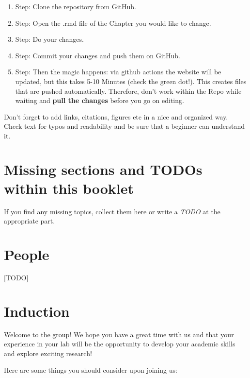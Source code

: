 \documentclass[
]{book}
\begin{document}
\begin{enumerate}
\def\labelenumi{\arabic{enumi}.}
\item
  Step: Clone the repository from GitHub.
\item
  Step: Open the .rmd file of the Chapter you would like to change.
\item
  Step: Do your changes.
\item
  Step: Commit your changes and push them on GitHub.
\item
  Step: Then the magic happens: via github actions the website will be
  updated, but this takes 5-10 Minutes (check the green dot!). This
  creates files that are pushed automatically. Therefore, don't work
  within the Repo while waiting and \textbf{pull the changes} before you go
  on editing.
\end{enumerate}

Don't forget to add links, citations, figures etc in a nice and
organized way. Check text for typos and readability and be sure that a
beginner can understand it.

\section{Missing sections and TODOs within this booklet}\label{missing-sections-and-todos-within-this-booklet}

If you find any missing topics, collect them here or write a \emph{TODO} at
the appropriate part.

\section{People}\label{people}

{[}TODO{]}

\section{Induction}\label{induction}

Welcome to the group! We hope you have a great time with us and that
your experience in your lab will be the opportunity to develop your
academic skills and explore exciting research!

Here are some things you should consider upon joining us:
\end{document}
